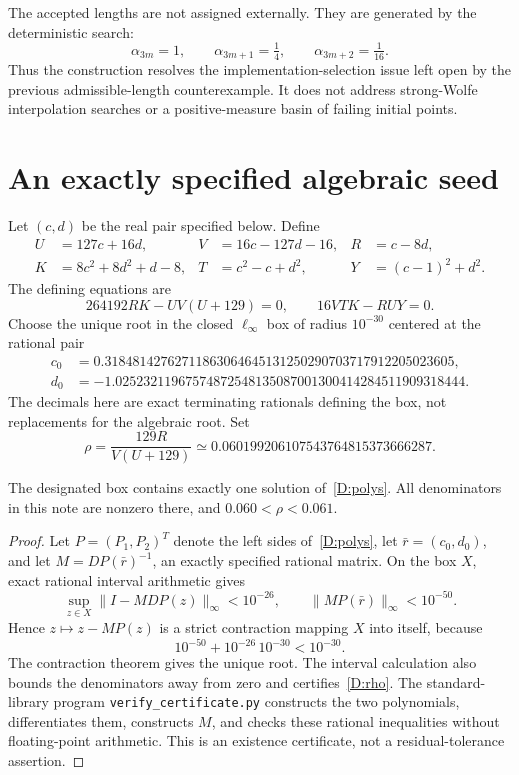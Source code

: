 The accepted lengths are not assigned externally. They are generated by the deterministic search:
\[
 \boxed{\alpha_{3m}=1,\qquad\alpha_{3m+1}=\tfrac14,\qquad\alpha_{3m+2}=\tfrac1{16}.}
\]
Thus the construction resolves the implementation-selection issue left open by the previous admissible-length counterexample. It does not address strong-Wolfe interpolation searches or a positive-measure basin of failing initial points.


\setcounter{section}{1}
\setcounter{theorem}{1}
\setcounter{lemma}{0}
\setcounter{corollary}{0}
\setcounter{proposition}{0}
\setcounter{remark}{0}
\setcounter{equation}{1}
\section{An exactly specified algebraic seed}
Let $(c,d)$ be the real pair specified below. Define
\begin{align*}
 U&=127c+16d,& V&=16c-127d-16,& R&=c-8d,\\
 K&=8c^2+8d^2+d-8,& T&=c^2-c+d^2,& Y&=(c-1)^2+d^2.
\end{align*}
The defining equations are
\begin{equation}\label{D:polys}
 \boxed{264192RK-U V(U+129)=0,\qquad16VTK-RUY=0.}
\end{equation}
Choose the unique root in the closed $\ell_\infty$ box of radius $10^{-30}$ centered at the rational pair
\begin{align*}
 c_0&=0.31848142762711863064645131250290703717912205023605,\\
 d_0&=-1.02523211967574872548135087001300414284511909318444.
\end{align*}
The decimals here are exact terminating rationals defining the box, not replacements for the algebraic root. Set
\begin{equation}\label{D:rho}
 \rho=\frac{129R}{V(U+129)}
       \simeq0.060199206107543764815373666287.
\end{equation}

\begin{lemma}\label{D:root}
The designated box contains exactly one solution of~\eqref{D:polys}. All denominators in this note are nonzero there, and $0.060<\rho<0.061$.
\end{lemma}
\begin{proof}
Let $P=(P_1,P_2)^T$ denote the left sides of~\eqref{D:polys}, let $\bar r=(c_0,d_0)$, and let $M=DP(\bar r)^{-1}$, an exactly specified rational matrix. On the box $X$, exact rational interval arithmetic gives
\[
 \sup_{z\in X}\|I-MDP(z)\|_\infty<10^{-26},
 \qquad\|MP(\bar r)\|_\infty<10^{-50}.
\]
Hence $z\mapsto z-MP(z)$ is a strict contraction mapping $X$ into itself, because
\[
 10^{-50}+10^{-26}\,10^{-30}<10^{-30}.
\]
The contraction theorem gives the unique root. The interval calculation also bounds the denominators away from zero and certifies~\eqref{D:rho}. The standard-library program \texttt{verify\_certificate.py} constructs the two polynomials, differentiates them, constructs $M$, and checks these rational inequalities without floating-point arithmetic. This is an existence certificate, not a residual-tolerance assertion.
\end{proof}

